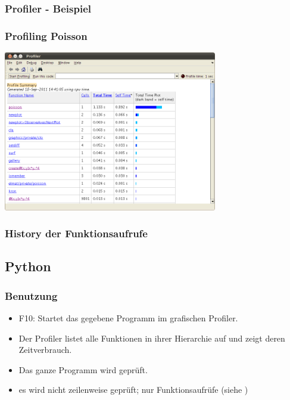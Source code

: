\documentclass[hyperref={xetex}]{beamer}
\begin{document}
\begin{frame}[fragile]\frametitle{Profiler - Beispiel}
\end{frame}

\begin{frame}[fragile]\frametitle{Profiling Poisson}
\begin{center}
\includegraphics[width=0.7\textwidth]{./figures/profile_poisson}
\end{center}
\end{frame}

\begin{frame}[fragile]\frametitle{History der Funktionsaufrufe}
\end{frame}




\subsection{Python}
\begin{frame}[fragile]\frametitle{Benutzung}
  \begin{itemize}
    \item \alert{F10}: Startet das gegebene Programm im grafischen Profiler.
    \item Der Profiler listet alle Funktionen in ihrer Hierarchie auf und zeigt deren Zeitverbrauch.
    \item Das ganze Programm wird geprüft.
    \item es wird nicht zeilenweise geprüft; nur Funktionsaufrüfe (siehe )
  \end{itemize}

\end{frame}
\end{document}
